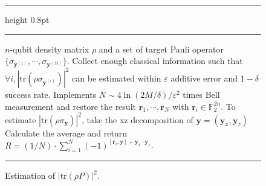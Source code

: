 \documentclass[aps,%
twocolumn,%
floatfix,%
pra,%
amsfonts,%
groupedaddress,%
superscriptaddress]{revtex4-2}%
\newcommand{\1}{\mathbbm{1}}
\begin{document}
\begin{figure}[htbp!]    
    \centering
    \hrule height 0.8pt \vspace{-8pt} 
    \caption{Estimation of $|\text{tr}(\rho P)|^2$.}
    \label{alg:est_Pauli_const}
    \vspace{1pt} \hrule \vspace{2pt}
        \begin{algorithmic}[1]
        \Require  $n$-qubit density matrix $\rho$ and a set of target Pauli operator $\{\sigma_{\mathbf{y}^{(1)}},\cdots,\sigma_{\mathbf{y}^{(M)}}\}$.
        \Ensure Collect enough classical information such that  $\forall i, |\text{tr}(\rho \sigma_{\mathbf{y}^{(i)}})|^2$ can be estimated within $\varepsilon$ additive error and $1 - \delta$ success rate.
        \State Implements $N \sim 4 \ln(2M/\delta)/\varepsilon^2$ times Bell measurement and restore the result $\mathbf{r}_1, \cdots, \mathbf{r}_N$ with $\mathbf{r}_i \in \mathbb{F}_2^{2n}$.
        \State To estimate $|\text{tr}(\rho \sigma_{\mathbf{y}})|^2$, take the xz decomposition of $\mathbf y = (\mathbf{y}_x, \mathbf{y}_z)$
        \State Calculate the average and return $R =({1}/{N})\cdot\sum_{i = 1}^N(-1)^{[\mathbf r_i, \mathbf y]+\mathbf y_{x} \cdot \mathbf y_z}$.
        \end{algorithmic}
    \vspace{5pt} \hrule %
    \end{figure}
\end{document}
